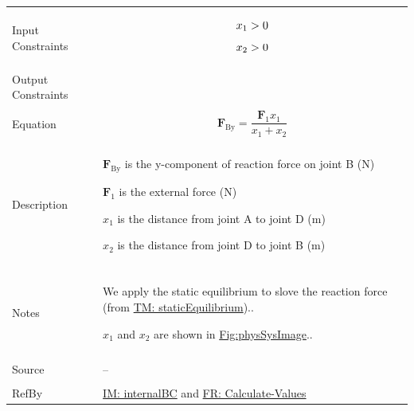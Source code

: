 \documentclass[12pt]{article}
\newcommand{\gt}{\ensuremath >}
\begin{document}
\begin{minipage}{\textwidth}
\begin{tabular}{>{\raggedright}p{}>{\raggedright\arraybackslash}p{}}
\\ \midrule \\
Input Constraints & \begin{displaymath}
                    {x_{\text{1}}}\gt{}0
                    \end{displaymath}
                    \begin{displaymath}
                    {x_{\text{2}}}\gt{}0
                    \end{displaymath}
\\ \midrule \\
Output Constraints & 
\\ \midrule \\
Equation & \begin{displaymath}
           {\mathbf{F}_{\text{By}}}=\frac{{\mathbf{F}_{1}} {x_{\text{1}}}}{{x_{\text{1}}}+{x_{\text{2}}}}
           \end{displaymath}
\\ \midrule \\
Description & \begin{symbDescription}
              \item{${\mathbf{F}_{\text{By}}}$ is the y-component of reaction force on joint B (${\text{N}}$)}
              \item{${\mathbf{F}_{1}}$ is the external force (${\text{N}}$)}
              \item{${x_{\text{1}}}$ is the distance from joint A to joint D (${\text{m}}$)}
              \item{${x_{\text{2}}}$ is the distance from joint D to joint B (${\text{m}}$)}
              \end{symbDescription}
\\ \midrule \\
Notes & We apply the static equilibrium to slove the reaction force (from \hyperref[TM:staticEquilibrium]{TM: staticEquilibrium})..
        
        ${x_{\text{1}}}$ and ${x_{\text{2}}}$ are shown in \hyperref[Figure:physSysImage]{Fig:physSysImage}..
        
\\ \midrule \\
Source & --
         
\\ \midrule \\
RefBy & \hyperref[IM:internalBC]{IM: internalBC} and \hyperref[calcValues]{FR: Calculate-Values}
        
\\ \bottomrule
\end{tabular}
\end{minipage}
\end{document}
